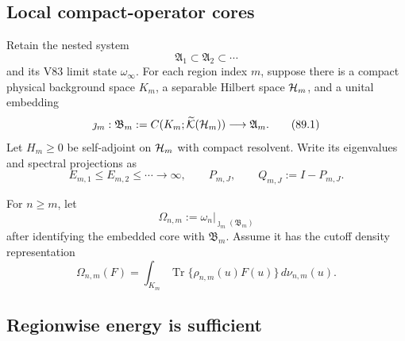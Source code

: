 \documentclass[11pt]{article}
\theoremstyle{remark}
\begin{document}
\subsection{Local compact-operator cores}

Retain the nested system
\[
 {\mathfrak A}_1\subset{\mathfrak A}_2\subset\cdots
\]
and its V83 limit state \(\omega_\infty\).  For each region index
\(m\), suppose there is a compact physical background space \(K_m\),
a separable Hilbert space \({\cal H}_m\), and a unital embedding
\begin{equation}
 \jmath_m:
 {\mathfrak B}_m:=
 C(K_m;\widetilde{\cal K}({\cal H}_m))
 \longrightarrow{\mathfrak A}_m.                            \tag{89.1}
\end{equation}
Let \(H_m\geq0\) be self-adjoint on \({\cal H}_m\) with compact
resolvent.  Write its eigenvalues and spectral projections as
\[
 E_{m,1}\leq E_{m,2}\leq\cdots\longrightarrow\infty,\qquad
 P_{m,J},\qquad Q_{m,J}:=I-P_{m,J}.                          \tag{89.2}
\]

For \(n\geq m\), let
\[
                         \Omega_{n,m}
 :=\omega_n|_{\jmath_m({\mathfrak B}_m)}
\]
after identifying the embedded core with \({\mathfrak B}_m\).
Assume it has the cutoff density representation
\begin{equation}
 \Omega_{n,m}(F)
 =
 \int_{K_m}\operatorname{Tr}\{
 \rho_{n,m}(u)F(u)\}\,d\nu_{n,m}(u).                        \tag{89.3}
\end{equation}

\subsection{Regionwise energy is sufficient}
\end{document}
